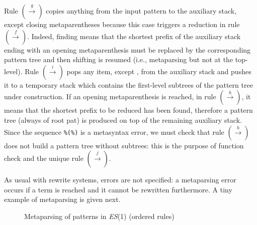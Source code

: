 Rule \((\xrightarrow{g})\) copies anything from the input pattern to
the auxiliary stack, except closing meta\-parentheses because this
case triggers a reduction in rule \((\xrightarrow{f})\). Indeed,
finding \mrp means that the shortest prefix of the auxiliary stack
ending with an opening meta\-parenthesis must be replaced by the
corresponding pattern tree and then shifting is resumed (i.e.,
meta\-parsing but not at the top\hyp{}level). Rule
\((\xrightarrow{i})\) pops any item, except \mlp, from the auxiliary
stack and pushes it to a temporary stack which contains the
first\hyp{}level subtrees of the pattern tree under construction. If
an opening meta\-parenthesis is reached, in rule
\((\xrightarrow{h})\), it means that the shortest prefix to be reduced
has been found, therefore a pattern tree (always of root \textsf{pat})
is produced on top of the remaining auxiliary stack. Since the
sequence \texttt{\%(\%)} is a meta\-syntax error, we must check that
rule \((\xrightarrow{h})\) does not build a pattern tree without
subtrees: this is the purpose of function \textsf{check} and the
unique rule \((\xrightarrow{j})\).

As usual with rewrite systems, errors are not specified: a
meta\-parsing error occurs if a term is reached and it cannot be
rewritten furthermore. A tiny example of meta\-parsing is given next.

\begin{figure}[t]
\caption{Meta\-parsing of patterns in
  \textit{ES}(1) (ordered rules)\label{es1_metaparsing}}
\end{figure}

